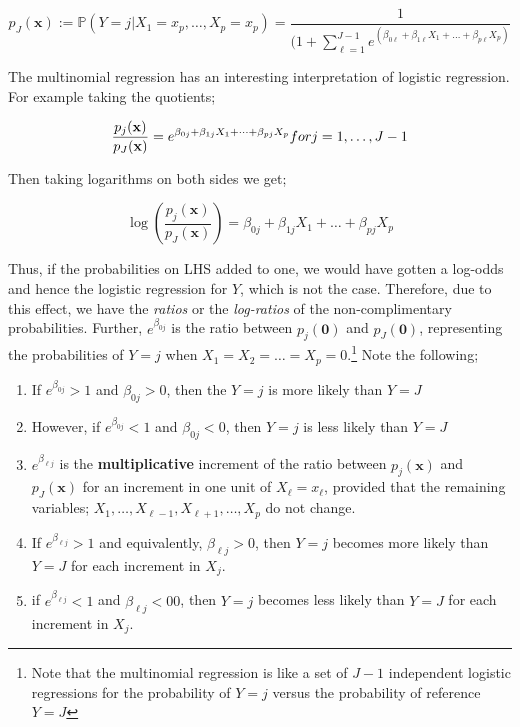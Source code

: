 \documentclass[
]{article}
\begin{document}
\[p_J(\mathbf{x}):=\mathbb{P}(Y=j|X_1=x_p,\dots,X_p=x_p)=\frac{1}{(1+\sum_{\ell=1}^{J-1}e^{(\beta_{0\ell}+\beta_{1\ell}X_1+\dots+\beta_{p\ell}X_p)}}\]

The multinomial regression has an interesting interpretation of logistic
regression. For example taking the quotients;

\[\frac{p_j(\mathbf{x})}{p_J(\mathbf{x})}= e^{\beta_{0j}+\beta_{1j}X_1+\dots+\beta_{pj}X_p}\space for\space j=1,\dots,J-1\]

Then taking logarithms on both sides we get;

\[\log{(\frac{p_j(\mathbf{x})}{p_J(\mathbf{x})})}=\beta_{0j}+\beta_{1j}X_1+\dots+\beta_{pj}X_p\]

Thus, if the probabilities on LHS added to one, we would have gotten a
log-odds and hence the logistic regression for \(Y\), which is not the
case. Therefore, due to this effect, we have the \emph{ratios} or the
\emph{log-ratios} of the non-complimentary probabilities. Further,
\(e^{\beta_{0j}}\) is the ratio between \(p_j(\mathbf{0})\) and
\(p_J(\mathbf{0})\), representing the probabilities of \(Y=j\) when
\(X_1=X_2=\dots=X_p=0\).\footnote{Note that the multinomial regression
  is like a set of \(J-1\) independent logistic regressions for the
  probability of \(Y=j\) versus the probability of reference \(Y=J\)}
Note the following;

\begin{enumerate}
\def\labelenumi{\arabic{enumi}.}
\item
  If \(e^{\beta_{0j}}>1\) and \(\beta_{0j}>0\), then the \(Y=j\) is more
  likely than \(Y=J\)
\item
  However, if \(e^{\beta_{0j}}<1\) and \(\beta_{0j}<0\), then \(Y=j\) is
  less likely than \(Y=J\)
\item
  \(e^{\beta_{\ell j}}\) is the \textbf{multiplicative} increment of the
  ratio between \(p_j(\mathbf{x})\) and \(p_J(\mathbf{x})\) for an
  increment in one unit of \(X_\ell=x_\ell\), provided that the
  remaining variables; \(X_1,\dots,X_{\ell-1},X_{\ell+1},\dots,X_p\) do
  not change.
\item
  If \(e^{\beta_{\ell j}}>1\) and equivalently, \(\beta_{\ell j}>0\),
  then \(Y=j\) becomes more likely than \(Y=J\) for each increment in
  \(X_j\).
\item
  if \(e^{\beta_{\ell j}}<1\) and \(\beta_{\ell j}<00\), then \(Y=j\)
  becomes less likely than \(Y=J\) for each increment in \(X_j\).
\end{enumerate}
\end{document}
